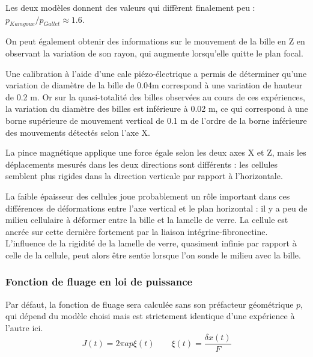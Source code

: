 Les deux modèles donnent des valeurs qui diffèrent finalement peu : $ p_{Kamgoue} / p_{Gallet} \approx 1.6$.

On peut également obtenir des informations sur le mouvement de la bille en Z en observant la variation de son rayon, qui augmente lorsqu'elle quitte le plan focal. 

Une calibration à l'aide d'une cale piézo-électrique a permis de déterminer qu'une variation de diamètre de la bille de 0.04\micro m correspond à une variation de hauteur de 0.2 \micro m. 
Or sur la quasi-totalité des billes observées au cours de ces expériences, la variation du diamètre des billes est inférieure à 0.02 \micro m, ce qui correspond à une borne supérieure de mouvement vertical de 0.1 \micro m de l'ordre de la borne inférieure des mouvements détectés selon l'axe X. 

La pince magnétique applique une force égale selon les deux axes X et Z, mais les déplacements mesurés dans les deux directions sont différents : les cellules semblent plus rigides dans la direction verticale par rapport à l'horizontale. 

La faible épaisseur des cellules joue probablement un rôle important dans ces différences de déformations entre l'axe vertical et le plan horizontal : il y a peu de milieu cellulaire à déformer entre la bille et la lamelle de verre. La cellule est ancrée sur cette dernière fortement par la liaison intégrine-fibronectine. L'influence de la rigidité de la lamelle de verre, quasiment infinie par rapport à celle de la cellule, peut alors être sentie lorsque l'on sonde le milieu avec la bille. 



\subsubsection{Fonction de fluage en loi de puissance}

Par défaut, la fonction de fluage sera calculée sans son préfacteur géométrique $p$, qui dépend du modèle choisi mais est strictement identique d'une expérience à l'autre ici.
$$ J(t) = 2 \pi a p \xi (t)\qquad \xi (t) = \frac{\delta x (t)}{F}$$
	
